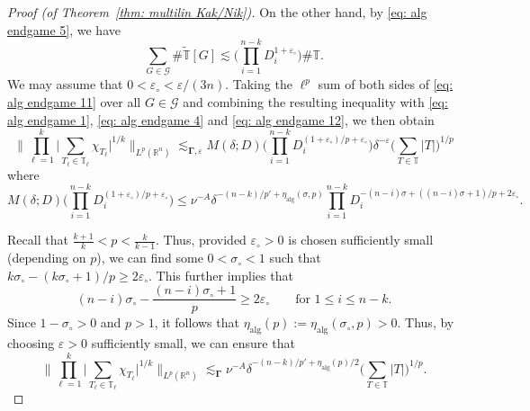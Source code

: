 \documentclass[reqno]{amsart}
\numberwithin{equation}{section}
\newcommand{\R}{\mathbb{R}}
\newcommand{\T}{\mathbb{T}}
\newcommand{\cG}{\mathcal{G}}
\newcommand{\bdGamma}{\boldsymbol{\Gamma}}
\theoremstyle{plain}
\theoremstyle{definition}
\newcommand{\alg}{\mathrm{alg}}
\begin{document}
\begin{proof}[Proof (of Theorem~\ref{thm: multilin Kak/Nik})]
 On the other hand, by \eqref{eq: alg endgame 5}, we have
\begin{equation}\label{eq: alg endgame 12}
  \sum_{G \in \cG} \#\widetilde{\T}[G] \lesssim \Big( \prod_{i = 1}^{n-k} D_i^{1 +\varepsilon_{\circ}}\Big) \#\T. 
\end{equation}
We may assume that $0< \varepsilon_{\circ} < \varepsilon/(3n)$. Taking the $\ell^p$ sum of both sides of \eqref{eq: alg endgame 11} over all $G \in \cG$ and combining the resulting inequality with \eqref{eq: alg endgame 1}, \eqref{eq: alg endgame 4} and \eqref{eq: alg endgame 12}, we then obtain 
\begin{equation*}
    \Big\|\prod_{\ell = 1}^k \big| \sum_{T_{\ell} \in \T_{\ell}} \chi_{T_{\ell}} \big|^{1/k} \Big\|_{L^p(\R^n)}  \lesssim_{\bdGamma,\varepsilon} M(\delta; D) \Big( \prod_{i = 1}^{n-k} D_i^{(1 +\varepsilon_{\circ})/p + \varepsilon_{\circ}}\Big) \delta^{-\varepsilon} \Big(\sum_{T \in \T} |T| \Big)^{1/p}
\end{equation*}
where
\begin{equation*}
  M(\delta; D) \Big( \prod_{i = 1}^{n-k} D_i^{(1 +\varepsilon_{\circ})/p + \varepsilon_{\circ}}\Big) \leq \nu^{-A} \delta^{-(n-k)/p' + \eta_{\alg}(\sigma,p)} \prod_{i = 1}^{n-k} D_i^{-(n - i)\sigma + ((n-i)\sigma + 1)/p + 2 \varepsilon_{\circ}}. 
\end{equation*}

Recall that $\frac{k+1}{k} < p < \frac{k}{k-1}$. Thus, provided $\varepsilon_{\circ} > 0$ is chosen sufficiently small (depending on $p$), we can find some $0 < \sigma_{\circ} < 1$ such that $k\sigma_{\circ} - (k\sigma_{\circ} + 1)/p \geq 2 \varepsilon_{\circ}$. This further implies that
\begin{equation*}
  (n-i)\sigma_{\circ} - \frac{(n-i)\sigma_{\circ} + 1}{p} \geq 2\varepsilon_{\circ} \qquad \textrm{for $1 \leq i \leq n - k$.} 
\end{equation*}
Since $1 - \sigma_{\circ} > 0$ and $p > 1$, it follows that $\eta_{\alg}(p) := \eta_{\alg}(\sigma_{\circ}, p) > 0$. Thus, by choosing $\varepsilon > 0$ sufficiently small, we can ensure that
\begin{equation*}
    \Big\|\prod_{\ell = 1}^k \big| \sum_{T_{\ell} \in \T_{\ell}} \chi_{T_{\ell}} \big|^{1/k} \Big\|_{L^p(\R^n)}  \lesssim_{\bdGamma}  \nu^{-A} \delta^{-(n-k)/p' + \eta_{\alg}(p)/2}\Big(\sum_{T \in \T} |T| \Big)^{1/p}.
\end{equation*}


\end{proof}
\end{document}
